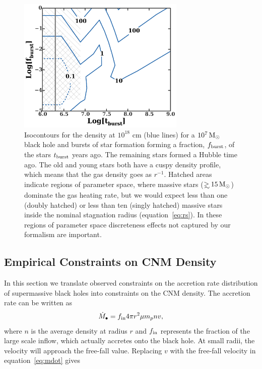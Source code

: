 \documentclass[usenatbib,fleqn]{mnras}
\newcommand\gsim{\mathrel{\rlap{\lower4pt\hbox{\hskip1pt$\sim$}}
    \raise1pt\hbox{$>$}}}
\newcommand{\Msun}{{\rm M_\odot}}
\begin{document}
\begin{figure} 
  \includegraphics[width=8cm]{cnm_plot.pdf}
  \caption{\label{fig:param} Isocontours for the density at $10^{18}$
    cm (blue lines) for a $10^{7} \, \Msun$ black hole and bursts of
    star formation forming a fraction, $f_{\rm burst}$, of the stars
    $t_{\rm burst}$ years ago. The remaining stars formed a Hubble
    time ago. The old and young stars both have a cuspy density
    profile, which means that the gas density goes as $r^{-1}$.
    Hatched areas indicate regions of parameter space, where massive
    stars ($\gsim 15 \, \Msun$) dominate the gas heating rate, but we
    would expect less than one (doubly hatched) or less than ten
    (singly hatched) massive stars inside the nominal stagnation
    radius (equation~\ref{eq:rs}). In these regions of parameter space
    discreteness effects not captured by our formalism are important.}
\end{figure}



\subsection{Empirical Constraints on CNM Density}
\label{sec:empirical}

In this section we translate observed constraints on the accretion
rate distribution of supermassive black holes into constraints on the CNM
density.  The accretion rate can be written as
\begin{equation}
\dot{M}_{\bullet} = f_{\rm in} 4 \pi r^2 \mu m_p n v,
\label{eq:mdot}
\end{equation}
where $n$ is the average density at radius $r$ and $f_{\rm in}$
represents the fraction of the large scale inflow, which actually
accretes onto the black hole. At small radii, the velocity will
approach the free-fall value. Replacing $v$ with the free-fall
velocity in equation~\eqref{eq:mdot} gives
\end{document}
